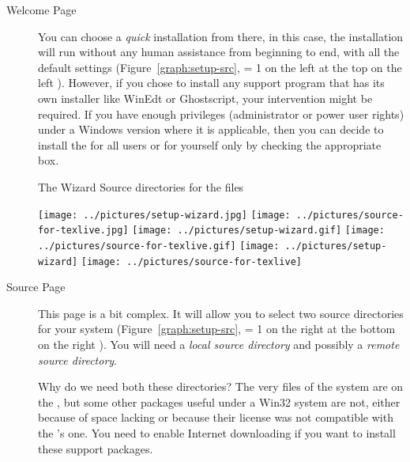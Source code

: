 \documentclass{article}
\begin{document}
\begin{description}
\item[Welcome Page] 
  You can choose a \emph{quick} installation from
  there, in this case, the installation will run without any human
  assistance from beginning to end, with all the default settings
  (Figure~\ref{graph:setup-src},
  \ifnum \Status = 1
  on the left%
  \else\ifnum {}
  at the top%
  \else
  on the left%
  \fi\fi
  ). However, if you chose to install any support program that has its
  own installer like WinEdt or Ghostscript, your intervention might be required.
  If you have enough privileges (administrator or power user rights)
  under a Windows version where it is applicable, then you can decide
  to install the \TeXLive{} for all users or for yourself only by
  checking the appropriate box.
  
  \begin{figure*}[!htb]
  The  Wizard\hfill
  Source directories for the \TeXLive{} files

 \begin{center}
  \ifnum {}
    \texttt{[image: ../pictures/setup-wizard.jpg]}\hfill%
    \texttt{[image: ../pictures/source-for-texlive.jpg]}
  \else
    \ifnum {}
\texttt{[image: ../pictures/setup-wizard.gif]}
\texttt{[image: ../pictures/source-for-texlive.gif]}
    \else
        \texttt{[image: ../pictures/setup-wizard]}%
                        \hfill%
        \texttt{[image: ../pictures/source-for-texlive]}
    \fi
  \fi
 \caption{The \TeXLive{} setup wizard}\label{graph:setup-src}
 \end{center}
\end{figure*}
\item[Source Page] 
  This page is a bit complex. It will allow you to select two source
  directories for your \TeXLive{} system
  (Figure~\ref{graph:setup-src}, 
  \ifnum \Status = 1
  on the right%
  \else\ifnum {}
  at the bottom%
  \else
  on the right%
  \fi\fi
  ). You will need a \emph{local
  source directory} and possibly a \emph{remote source directory}.

  Why do we need both these directories? The very files of the
  \TeXLive{} system are on the \CD{}, but some other packages useful
  under a Win32 system are not, either because of space lacking or
  because their license was not compatible with the \TeXLive{}'s one.
  You need to enable Internet downloading if you want to install these
  support packages.


\end{description}
\end{document}
